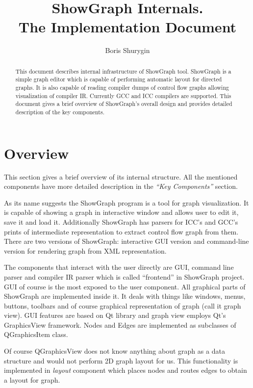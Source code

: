 \documentclass[11pt,twoside,a4paper]{article}
\begin{document}
 
\lstset{language=[Visual]C++}

\title{ShowGraph Internals.\\ \textsf{The Implementation Document}}
\author{Boris Shurygin}

\maketitle
\begin{abstract}
This document describes internal infrastructure of ShowGraph tool. ShowGraph is a simple graph editor which is capable of performing automatic layout for directed graphs. It is also capable of reading compiler dumps of control flow graphs allowing visualization of compiler IR. Currently GCC and ICC compilers are supported. This document gives a brief overview of ShowGraph's overall design and provides detailed description of the key components.
\end{abstract}
\tableofcontents
\section{Overview}
This section gives a brief overview of its internal structure. All the mentioned components have more detailed description in the \emph{``Key Components''} section.

As its name suggests the ShowGraph program is a tool for graph visualization. It is capable of showing a graph in interactive window and allows user to edit it, save it and load it. Additionally ShowGraph has parsers for ICC's and GCC's prints of intermediate representation to extract control flow graph from them. There are two versions of ShowGraph: interactive GUI version and command-line version for rendering graph from XML representation.

The components that interact with the user directly are GUI, command line parser and compiler IR parser which is called ``frontend'' in ShowGraph project. GUI of course is the most exposed to the user component. All graphical parts of ShowGraph are implemented inside it. It deals with things like windows, menus, buttons, toolbars and of course graphical representation of graph (call it graph view). GUI features are based on Qt library and graph view employs Qt's GraphicsView framework. Nodes and Edges are implemented as subclasses of QGraphicsItem class.

Of course QGraphicsView does not know anything about graph as a data structure and would not perform 2D graph layout for us. This functionality is implemented in \emph{layout} component which places nodes and routes edges to obtain a layout for graph.
\end{document}
